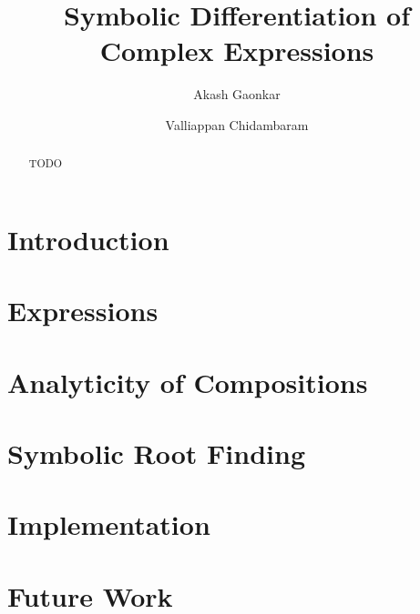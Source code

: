 \documentclass[sigplan]{acmart}
\title{Symbolic Differentiation of Complex Expressions}
\author{Akash Gaonkar}
\affiliation{\institution{University of Colorado at Boulder}}
\author{Valliappan Chidambaram}
\affiliation{\institution{University of Colorado at Boulder}}
\begin{document}
  \begin{abstract}
    TODO
  \end{abstract}

  \maketitle

  \section{Introduction}
  \label{sec:introduction}
  

  \section{Expressions}
  \label{sec:expressions}
  

  \section{Analyticity of Compositions}
  \label{sec:analyticity}
  

  \section{Symbolic Root Finding}
  \label{sec:rootfinding}
  

  \section{Implementation}
  \label{sec:implementation}
  

  \section{Future Work}
  \label{sec:futurework}
  
\end{document}
